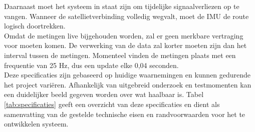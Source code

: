 Daarnaast moet het systeem in staat zijn om tijdelijke signaalverliezen op te vangen. Wanneer de satellietverbinding volledig wegvalt, moet de IMU de route logisch doortrekken. \\

Omdat de metingen live bijgehouden worden, zal er geen merkbare vertraging voor moeten komen. De verwerking van de data zal korter moeten zijn dan het interval tussen de metingen. Momenteel vinden de metingen plaats met een frequentie van 25 Hz, dus een update elke 0,04 seconden. \\

Deze specificaties zijn gebaseerd op huidige waarnemingen en kunnen gedurende het project variëren. Afhankelijk van uitgebreid onderzoek en testmomenten kan een duidelijker beeld gegeven worden over wat haalbaar is. Tabel \ref{tab:specificaties} geeft een overzicht van deze specificaties en dient als samenvatting van de gestelde technische eisen en randvoorwaarden voor het te ontwikkelen systeem.

